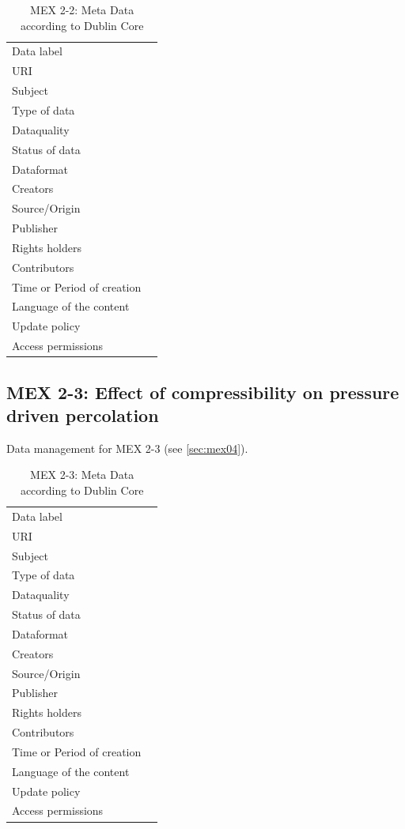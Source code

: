 \begin{table}[h!]
\caption{MEX 2-2: Meta Data according to Dublin Core}
\label{tab:}
\small
\begin{tabular}{R{3cm}|L{7cm}}
\hline
%
Data label &  \\
URI &  \\
Subject  &  \\
Type of data  &  \\
Dataquality  &  \\
Status of data  &  \\
Dataformat  & \\
Creators  &  \\
Source/Origin &  \\
Publisher  &  \\
Rights holders &  \\
Contributors &  \\
Time or Period of creation &  \\
Language of the content &  \\
Update policy &  \\
Access permissions &  \\
%
\hline
\end{tabular}
\end{table}

\subsection{MEX 2-3: Effect of compressibility on pressure driven percolation}

Data management for MEX 2-3 (see \ref{sec:mex04}).

\begin{table}[h!]
\caption{MEX 2-3: Meta Data according to Dublin Core}
\label{tab:}
\small
\begin{tabular}{R{3cm}|L{7cm}}
\hline
%
Data label &  \\
URI &  \\
Subject  &  \\
Type of data  &  \\
Dataquality  &  \\
Status of data  &  \\
Dataformat  & \\
Creators  &  \\
Source/Origin &  \\
Publisher  &  \\
Rights holders &  \\
Contributors &  \\
Time or Period of creation &  \\
Language of the content &  \\
Update policy &  \\
Access permissions &  \\
%
\hline
\end{tabular}
\end{table}

